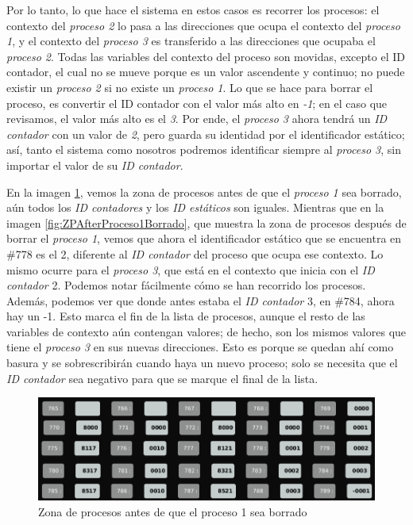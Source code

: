 \documentclass[letterpaper,12pt,oneside]{book}
\begin{document}
		Por lo tanto, lo que hace el sistema
		en estos casos
		es recorrer los procesos: el contexto del  \textit{proceso 2} lo pasa a las direcciones que ocupa 
		el contexto del \textit{proceso 1}, y el contexto del \textit{proceso 3} es transferido a 
		las direcciones que ocupaba el \textit{proceso 2}. Todas las variables del contexto del proceso son movidas, excepto el ID contador, 
		el
		cual no se mueve porque es un valor ascendente y continuo; no puede existir un \textit{proceso 2} si no existe un \textit{proceso 1}. 
		Lo que se hace para borrar el proceso, es convertir el ID contador con el valor más 
		alto en \textit{-1}; en el caso que revisamos, el valor más alto es el \textit{3}. 
		Por ende, el \textit{proceso 3} ahora tendrá un \textit{ID contador} con un valor de \textit{2}, pero guarda
		su identidad por el identificador estático; así, tanto el sistema como nosotros podremos identificar siempre al \textit{proceso 3}, 
		sin importar el valor de su \textit{ID contador}.
		

		En la imagen \ref{fig:ZPBeforeProceso1Terminado}, vemos la zona de procesos antes de que el \textit{proceso 1} sea borrado, aún todos los 
		\textit{ID contadores} y los \textit{ID estáticos }
		son iguales. Mientras que en la imagen \ref{fig:ZPAfterProceso1Borrado}, que muestra
		la zona de procesos después de borrar el \textit{proceso 1}, vemos que ahora el identificador estático que se encuentra en
		\#778 es el 2, diferente al \textit{ID contador} del proceso que ocupa ese contexto. Lo mismo ocurre para el \textit{proceso 3},
		que está en el contexto que inicia con el \textit{ID contador} 2. Podemos notar fácilmente cómo se han recorrido los procesos.		
		Además, podemos ver que donde antes estaba el \textit{ID contador} 3, en 
		\#784, ahora
		hay un -1. Esto marca el fin de la lista de procesos, aunque el resto de las variables de contexto aún contengan valores;
		 de hecho, son los mismos valores
		que tiene el \textit{proceso 3} en sus nuevas direcciones. Esto es porque se quedan ahí como basura y se sobrescribirán cuando haya un nuevo 
		proceso; solo se necesita
		que el \textit{ID contador} sea negativo para que se marque el final de la lista.
		
		\begin{figure}[h]		
			\centering
			\includegraphics[scale=0.45]{media/CARDIACC/ZPBeforeProceso1Terminado.png}
			\caption{ Zona de procesos antes de que el proceso 1 sea borrado }
			\label{fig:ZPBeforeProceso1Terminado}
		\end{figure}
		
\end{document}

